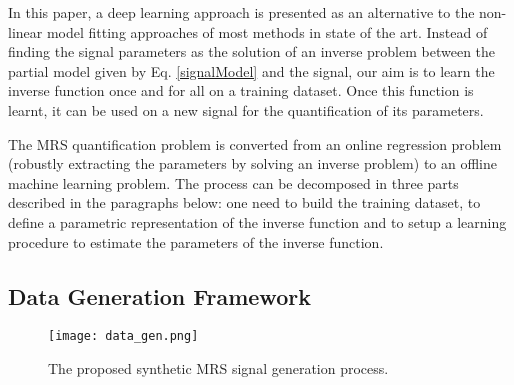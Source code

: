 \documentclass{llncs}
\begin{document}

In this paper, a deep learning approach is presented as an alternative to the non-linear model fitting approaches of most methods in state of the art.
Instead of finding the signal parameters as the solution of an inverse problem between the partial model given by Eq. \ref{signalModel} and the signal,
our aim is to learn the inverse function once and for all on a training dataset.
Once this function is learnt, it can be used on a new signal for the quantification of its parameters.

The MRS quantification problem is converted from an online regression problem (robustly extracting the parameters by solving an inverse problem) to an
offline machine learning problem.
The process can be decomposed in three parts described in the paragraphs below:
one need to build the training dataset, to define a parametric representation of the inverse function 
and to setup a learning procedure to estimate the parameters of the inverse function.



\subsection{Data Generation Framework}

\begin{figure*}[t!]
\centering
\texttt{[image: data\_gen.png]}
\caption{The proposed synthetic MRS signal generation process.}
\label{figDataGeneration}
\end{figure*}
\end{document}
